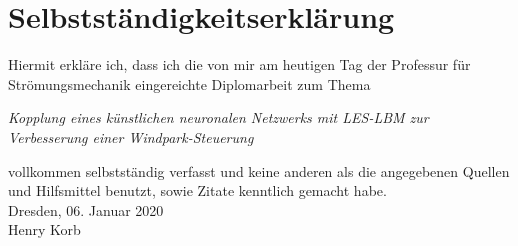 \cleardoublepage
\chapter*{Selbstständigkeitserklärung}
\thispagestyle{empty}
Hiermit erkläre ich, dass ich die von mir am heutigen Tag der Professur für Strömungsmechanik eingereichte
Diplomarbeit
zum Thema
\begin{center}
\textit{Kopplung eines künstlichen neuronalen Netzwerks mit LES-LBM zur Verbesserung einer Windpark-Steuerung}
\end{center}
vollkommen selbstständig verfasst und keine anderen als die angegebenen Quellen und Hilfsmittel benutzt, sowie Zitate kenntlich gemacht habe.
\\[10mm]
Dresden, 06. Januar 2020 \\[1cm]
Henry Korb
